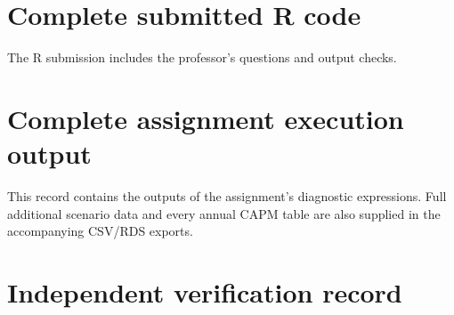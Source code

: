 \documentclass[11pt,letterpaper]{article}
\begin{document}
\clearpage
\section{Complete submitted R code}
\label{app:code}
The R submission includes the professor's questions and output checks.


\clearpage
\section{Complete assignment execution output}
\label{app:execution}
This record contains the outputs of the assignment's diagnostic expressions.
Full additional scenario data and every annual CAPM table are also supplied
in the accompanying CSV/RDS exports.


\clearpage
\section{Independent verification record}
\label{app:verification}

\end{document}
